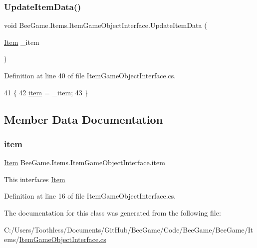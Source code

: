 \subsubsection{\texorpdfstring{Update\+Item\+Data()}{UpdateItemData()}}
{\footnotesize\ttfamily void Bee\+Game.\+Items.\+Item\+Game\+Object\+Interface.\+Update\+Item\+Data (\begin{DoxyParamCaption}\item[{\hyperlink{struct_bee_game_1_1_items_1_1_item}{Item}}]{\+\_\+item }\end{DoxyParamCaption})}



Definition at line 40 of file Item\+Game\+Object\+Interface.\+cs.


\begin{DoxyCode}
41         \{
42             \hyperlink{class_bee_game_1_1_items_1_1_item_game_object_interface_abe9476a5393ff778bd99f684b24886ad}{item} = \_item;
43         \}
\end{DoxyCode}


\subsection{Member Data Documentation}
\mbox{\label{class_bee_game_1_1_items_1_1_item_game_object_interface_abe9476a5393ff778bd99f684b24886ad}} 
\subsubsection{\texorpdfstring{item}{item}}
{\footnotesize\ttfamily \hyperlink{struct_bee_game_1_1_items_1_1_item}{Item} Bee\+Game.\+Items.\+Item\+Game\+Object\+Interface.\+item}



This interfaces \hyperlink{struct_bee_game_1_1_items_1_1_item}{Item} 



Definition at line 16 of file Item\+Game\+Object\+Interface.\+cs.



The documentation for this class was generated from the following file\+:\begin{DoxyCompactItemize}
\item 
C\+:/\+Users/\+Toothless/\+Documents/\+Git\+Hub/\+Bee\+Game/\+Code/\+Bee\+Game/\+Bee\+Game/\+Items/\hyperlink{_item_game_object_interface_8cs}{Item\+Game\+Object\+Interface.\+cs}\end{DoxyCompactItemize}
